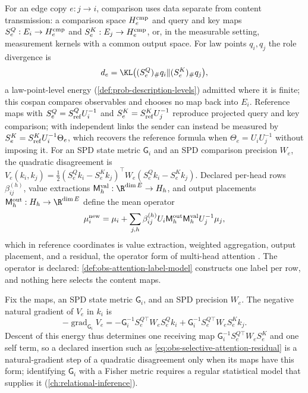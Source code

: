 For an edge copy \(e:j\to i\), comparison uses data separate from content
transmission: a comparison space \(H_e^{\rm cmp}\) and query and key maps
\(S^Q_e:E_i\to H_e^{\rm cmp}\) and \(S^K_e:E_j\to H_e^{\rm cmp}\), or, in the
measurable setting, measurement kernels with a common output space. For law
points \(q_i,q_j\) the role divergence is
\begin{equation}
d_e=\KL\bigl((S^Q_e)_\#q_i\Vert(S^K_e)_\#q_j\bigr),
\label{eq:obs-selective-role-divergence}
\end{equation}
a law-point-level energy (\cref{def:prob-description-levels}) admitted where it
is finite; this cospan compares observables and chooses no map back into
\(E_i\). Reference maps with \(S^Q_e=S^Q_{\rm ref}U_i^{-1}\) and
\(S^K_e=S^K_{\rm ref}U_j^{-1}\) reproduce projected query and key comparison;
with independent links the sender can instead be measured by
\(S^K_e=S^K_{\rm ref}U_i^{-1}\Theta_e\), which recovers the reference formula
when \(\Theta_e=U_iU_j^{-1}\) without imposing it. For an SPD state metric
\(\mathsf G_i\) and an SPD comparison precision \(W_e\), the quadratic
disagreement is
\(V_e(k_i,k_j)=\tfrac12(S^Q_ek_i-S^K_ek_j)^\top W_e(S^Q_ek_i-S^K_ek_j)\).
Declared per-head rows \(\beta_{ij}^{(h)}\), value extractions
\(\mathsf M^{\rm val}_h:\R^{\dim E}\to H_h\), and output placements
\(\mathsf M^{\rm out}_h:H_h\to\R^{\dim E}\) define the mean operator
\begin{equation}
\mu_i^{\rm new}=\mu_i+\sum_{j,h}
\beta_{ij}^{(h)}U_i\mathsf M^{\rm out}_h\mathsf M^{\rm val}_hU_j^{-1}\mu_j,
\label{eq:obs-selective-attention-residual}
\end{equation}
which in reference coordinates is value extraction, weighted aggregation,
output placement, and a residual, the operator form of multi-head attention
\citep{vaswani2017attention}. The operator is declared:
\cref{def:obs-attention-label-model} constructs one label per row, and nothing
here selects the content maps.

Fix the maps, an SPD state metric \(\mathsf G_i\), and an SPD precision \(W_e\).
The negative natural gradient of \(V_e\) in \(k_i\) is
\begin{equation}
-\operatorname{grad}_{\mathsf G_i}V_e
=-\mathsf G_i^{-1}S_e^{Q\top}W_eS^Q_ek_i+\mathsf G_i^{-1}S_e^{Q\top}W_eS^K_ek_j.
\label{eq:obs-selective-response}
\end{equation}
Descent of this energy thus determines one receiving map
\(\mathsf G_i^{-1}S_e^{Q\top}W_eS^K_e\) and one self term, so a declared
insertion such as \eqref{eq:obs-selective-attention-residual} is a
natural-gradient step of a quadratic disagreement only when its maps have this
form; identifying \(\mathsf G_i\) with a Fisher metric requires a regular
statistical model that supplies it (\cref{ch:relational-inference}).

